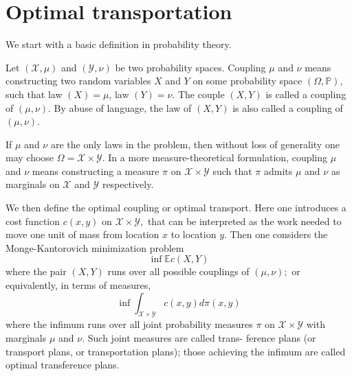 \section{Optimal transportation}
We start with a basic definition in probability theory.

\begin{defn}[Coupling]
	Let \( ( \mathcal { X } , \mu ) \) and \( ( \mathcal { Y } , \nu ) \) be two probability spaces. Coupling \( \mu \) and \( \nu \) means constructing two random variables \( X \) and \( Y \) on some probability space \( ( \Omega , \mathbb { P } ) , \) such that law \( ( X ) = \mu \), law \( ( Y ) = \nu . \) The couple \( ( X , Y ) \) is called a coupling of \( ( \mu , \nu ) . \) By abuse of language, the law of \( ( X , Y ) \) is also called a coupling of \( ( \mu , \nu ) \).
\end{defn}

If \( \mu \) and \( \nu \) are the only laws in the problem, then without loss of generality one may choose \( \Omega = \mathcal { X } \times \mathcal { Y } . \) In a more measure-theoretical formulation, coupling \( \mu \) and \( \nu \) means constructing a measure \( \pi \) on \( \mathcal { X } \times \mathcal { Y } \) such that \( \pi \) admits \( \mu \) and \( \nu \) as marginals on \( \mathcal { X } \) and \( \mathcal { Y } \) respectively.


We then define the optimal coupling or optimal transport. Here one introduces a cost function \( c ( x , y ) \) on \( \mathcal { X } \times \mathcal { Y } , \) that can be interpreted as the work needed to move one unit of mass from location \( x \) to location \( y . \) Then one considers the Monge-Kantorovich minimization problem
\[
	\operatorname{inf}  \mathbb { E } c ( X , Y )
\]
where the pair \( ( X , Y ) \) runs over all possible couplings of \( ( \mu , \nu ) ; \) or equivalently, in terms of measures,
\[ \inf \int _ { \mathcal { X } \times \mathcal { Y } } c ( x , y ) d \pi ( x , y ) \]
where the infimum runs over all joint probability measures \( \pi \) on \( \mathcal { X } \times \mathcal { Y } \) with marginals \( \mu \) and \( \nu . \) Such joint measures are called trans- ference plans (or transport plans, or transportation plans); those achieving the infimum are called optimal transference plans.

